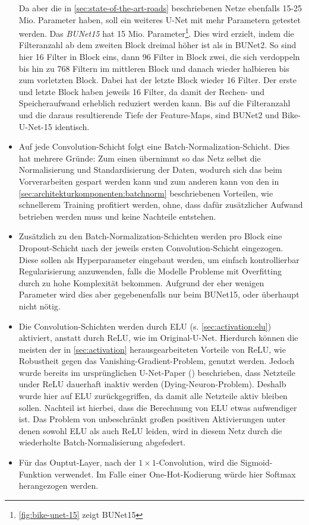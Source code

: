 \begin{itemize}
	Da aber die in \autoref{sec:state-of-the-art-roads} beschriebenen Netze ebenfalls 15-25 Mio. Parameter haben, 
	soll ein weiteres U-Net mit mehr Parametern getestet werden. Das \textit{\ac{BUNet15}} hat 15 Mio. 
	Parameter\footnote{\autoref{fig:bike-unet-15} zeigt \ac{BUNet15}}. Dies wird erzielt, 
	indem die Filteranzahl ab dem zweiten Block dreimal höher ist als in \ac{BUNet2}. So sind hier 16 Filter in Block eins, 
	dann 96 Filter in Block zwei, die sich verdoppeln bis hin zu 768 Filtern im mittleren Block und danach wieder halbieren bis zum vorletzten Block. 
	Dabei hat der letzte Block wieder 16 Filter. 
	Der erste und letzte Block haben jeweils 16 Filter, da damit der Rechen- und Speicheraufwand erheblich reduziert werden kann.
	Bis auf die Filteranzahl und die daraus resultierende Tiefe der Feature-Maps, sind \ac{BUNet2} und Bike-U-Net-15 identisch.
	\item Auf jede Convolution-Schicht folgt eine Batch-Normalization-Schicht. 
	Dies hat mehrere Gründe: Zum einen übernimmt so das Netz selbst die Normalisierung und Standardisierung der Daten, 
	wodurch sich das beim Vorverarbeiten gespart werden kann und zum anderen kann von den in \autoref{sec:architekturkomponenten:batchnorm} 
	beschriebenen Vorteilen, wie schnellerem Training profitiert werden, 
	ohne, dass dafür zusätzlicher Aufwand betrieben werden muss und keine Nachteile entstehen.
	\item Zusätzlich zu den Batch-Normalization-Schichten werden pro Block eine Dropout-Schicht 
	nach der jeweils ersten Convolution-Schicht eingezogen. Diese sollen als 
    Hyperparameter eingebaut werden, um einfach kontrollierbar Regularisierung anzuwenden, 
	falls die Modelle Probleme mit Overfitting durch zu hohe Komplexität bekommen. 
	Aufgrund der eher wenigen Parameter wird dies aber gegebenenfalls nur beim \ac{BUNet15}, 
	oder überhaupt nicht nötig.
	\item Die Convolution-Schichten werden durch \ac{ELU} (s. \autoref{sec:activation:elu}) aktiviert, 
	anstatt durch \ac{ReLU}, wie im Original-U-Net. 
	Hierdurch können die meisten der in \autoref{sec:activation} herausgearbeiteten Vorteile von \ac{ReLU},
	wie Robustheit gegen das Vanishing-Gradient-Problem, genutzt werden. Jedoch wurde bereits im ursprünglichen U-Net-Paper 
	(\cite{Ronneberger.18052015}) beschrieben, dass Netzteile under \ac{ReLU} dauerhaft inaktiv werden (Dying-Neuron-Problem). 
	Deshalb wurde hier auf \ac{ELU} zurückgegriffen, da damit alle Netzteile aktiv bleiben sollen. 
	Nachteil ist hierbei, dass die Berechnung von \ac{ELU} etwas aufwendiger ist. 
	Das Problem von unbeschränkt großen positiven Aktivierungen unter denen sowohl \ac{ELU} als auch \ac{ReLU} leiden,
	wird in diesem Netz durch die wiederholte Batch-Normalisierung abgefedert.
	\item Für das Ouptut-Layer, nach der $1\times 1$-Convolution, wird die Sigmoid-Funktion verwendet. 
	Im Falle einer One-Hot-Kodierung würde hier Softmax herangezogen werden. 
\end{itemize}

